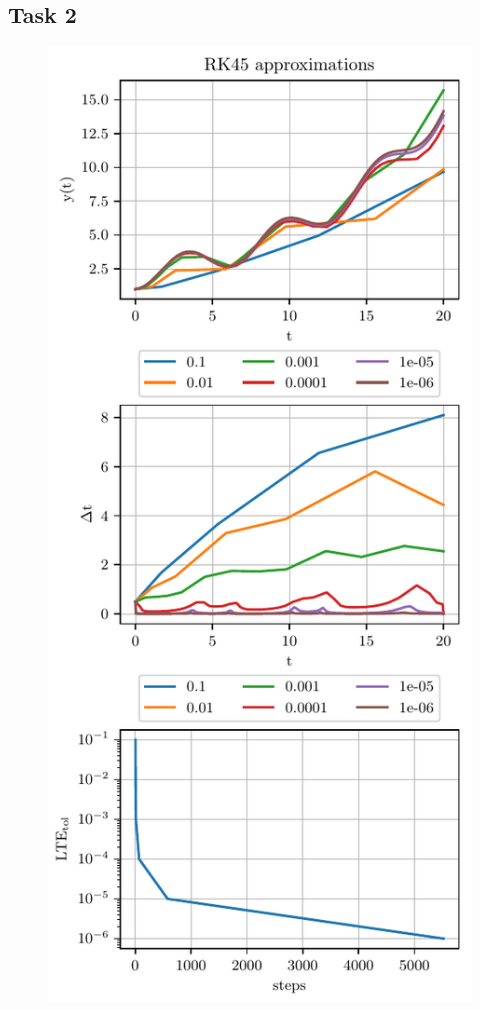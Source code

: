 \documentclass{aa}
\begin{document}
\subsection{Task 2}%
\label{ssub:res_task_2}
\begin{figure}[htbp]
    \centering
    \captionsetup{width = 0.9 \linewidth}
    \includegraphics[width=\linewidth]{../Task_02/runge-kutta-fehlberg.pdf}

\end{figure}
\end{document}
